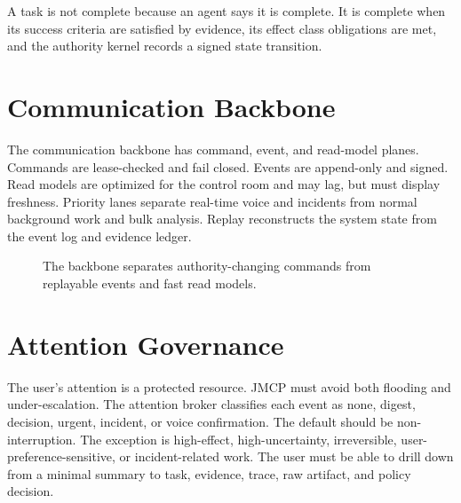\documentclass[10pt,journal,onecolumn]{IEEEtran}
\begin{document}
A task is not complete because an agent says it is complete. It is complete when its success criteria are satisfied by evidence, its effect class obligations are met, and the authority kernel records a signed state transition.

\section{Communication Backbone}
The communication backbone has command, event, and read-model planes. Commands are lease-checked and fail closed. Events are append-only and signed. Read models are optimized for the control room and may lag, but must display freshness. Priority lanes separate real-time voice and incidents from normal background work and bulk analysis. Replay reconstructs the system state from the event log and evidence ledger.

\begin{figure}[h]
\centering
{}
\caption{The backbone separates authority-changing commands from replayable events and fast read models.}
\end{figure}

\section{Attention Governance}
The user's attention is a protected resource. JMCP must avoid both flooding and under-escalation. The attention broker classifies each event as none, digest, decision, urgent, incident, or voice confirmation. The default should be non-interruption. The exception is high-effect, high-uncertainty, irreversible, user-preference-sensitive, or incident-related work. The user must be able to drill down from a minimal summary to task, evidence, trace, raw artifact, and policy decision.
\end{document}
